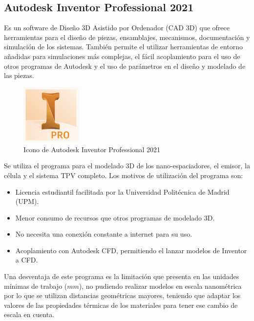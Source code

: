 \subsection{Autodesk Inventor Professional 2021}
Es un software de Diseño 3D Asistido por Ordenador (CAD 3D) que ofrece herramientas para el diseño de piezas, ensamblajes, mecanismos, documentación y simulación de los sistemas. También permite el utilizar herramientas de entorno añadidas para simulaciones más complejas, el fácil acoplamiento para el uso de otros programas de Autodesk y el uso de parámetros en el diseño y modelado de las piezas.
\begin{figure}[H]
	\centering
		\includegraphics[width=3cm]{figuras/inventorpro.png}
	\caption{Icono de Autodesk Inventor Professional 2021}
	\label{fig:inventorpro}
\end{figure}
Se utiliza el programa para el modelado 3D de los nano-espaciadores, el emisor, la célula y el sistema TPV completo. Los motivos de utilización del programa son:

\begin{itemize}
	\item Licencia estudiantil facilitada por la Universidad Politécnica de Madrid (UPM).
	\item Menor consumo de recursos que otros programas de modelado 3D.
	\item No necesita una conexión constante a internet para su uso.
	\item Acoplamiento con Autodesk CFD, permitiendo el lanzar modelos de Inventor a CFD. 
\end{itemize}
Una desventaja de este programa es la limitación que presenta en las unidades mínimas de trabajo ($mm$), no pudiendo realizar modelos en escala nanométrica por lo que se utilizan distancias geométricas mayores, teniendo que adaptar los valores de las propiedades térmicas de los materiales para tener ese cambio de escala en cuenta.
